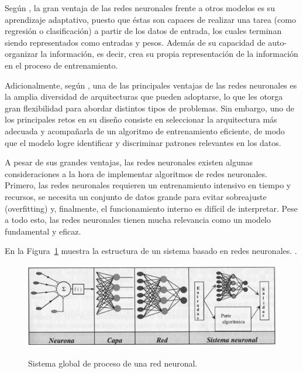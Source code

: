 \documentclass[11pt,a4paper,spanish]{book}
\numberwithin{equation}{chapter}
\numberwithin{figure}{chapter}
\begin{document}
Según \cite{rivera2007redes}, la gran ventaja de las redes neuronales frente a otros 
modelos es su aprendizaje adaptativo, puesto que éstas son capaces de realizar una 
tarea (como regresión o clasificación) a partir de los datos de entrada, los cuales 
terminan siendo representados como entradas y pesos.  Además de su capacidad de 
auto-organizar la información, es decir, crea su propia representación de la 
información en el proceso de entrenamiento. 


Adicionalmente, según \cite{varela2011redes}, una de las principales ventajas de las 
redes neuronales es la amplia diversidad de arquitecturas que pueden adoptarse, lo que 
les otorga gran flexibilidad para abordar distintos tipos de problemas. Sin embargo, 
uno de los principales retos en su diseño consiste en seleccionar la arquitectura más 
adecuada y acompañarla de un algoritmo de entrenamiento eficiente, de modo que el modelo 
logre identificar y discriminar patrones relevantes en los datos. 


A pesar de sus grandes ventajas, las redes neuronales existen algunas consideraciones a 
la hora de implementar algoritmos de redes neuronales. Primero, las redes neuronales 
requieren un entrenamiento intensivo en tiempo y recursos, se necesita un conjunto de 
datos grande para evitar sobreajuste (overfitting) y, finalmente, el funcionamiento 
interno es difícil de interpretar. Pese a todo esto, las redes neuronales tienen mucha 
relevancia como un modelo fundamental y eficaz. \cite{larranaga2021redes}


En la Figura~\ref{fig:figSistemaNeuronal} muestra la estructura de un sistema basado en
redes neuronales.  \citep{larranaga2021redes}.


\begin{figure}[H]
    \caption{Sistema global de proceso de una red neuronal. \protect\cite{larranaga2021redes}}
    \centering
    \includegraphics[width=1.0\textwidth]{media/sistema-neuronal.png}
    \label{fig:figSistemaNeuronal}
\end{figure}
\end{document}
